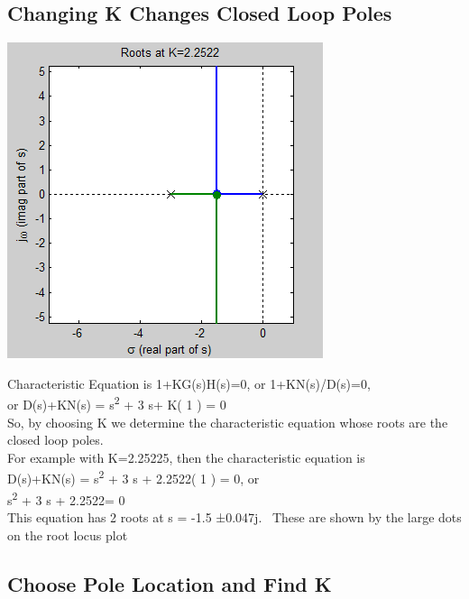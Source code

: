 \documentclass[16pt]{article}
\begin{document}
\subsection[Changing K Changes Closed Loop
Poles]{\texorpdfstring{\protect\hypertarget{RuleFindPole}{}{}Changing K
Changes Closed Loop
Poles}{Changing K Changes Closed Loop Poles}}\label{changing-k-changes-closed-loop-poles}

\includegraphics{./Root Locus_ Example 1_files/RLLocPos.png}

Characteristic Equation is 1+KG(s)H(s)=0, or 1+KN(s)/D(s)=0,\\
or D(s)+KN(s) = s\textsuperscript{2} + 3 s+ K( 1 ) =
0\\[2\baselineskip]So, by choosing K we determine the characteristic
equation whose roots are the closed loop poles.\\[2\baselineskip]For
example with K=2.25225, then the characteristic equation is\\
D(s)+KN(s) = s\textsuperscript{2} + 3 s + 2.2522( 1 ) = 0, or\\
s\textsuperscript{2} + 3 s + 2.2522= 0\\[2\baselineskip]This equation
has 2 roots at s = -1.5 ±0.047j.~ These are shown by the large dots on
the root locus plot\\

\subsection[Choose Pole Location and Find
K]{\texorpdfstring{\protect\hypertarget{RuleFindK}{}{}Choose Pole
Location and Find
K}{Choose Pole Location and Find K}}\label{choose-pole-location-and-find-k}
\end{document}
